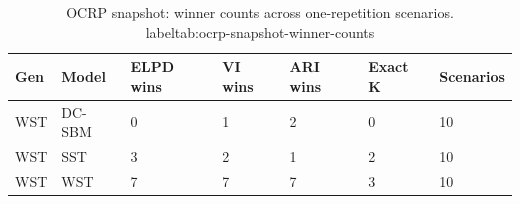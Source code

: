 \begin{table}[!h]
\centering
\caption{OCRP snapshot: winner counts across one-repetition scenarios.\\label{tab:ocrp-snapshot-winner-counts}}
\centering
\begin{tabular}[t]{lllllll}
\toprule
Gen & Model & ELPD wins & VI wins & ARI wins & Exact K & Scenarios\\
\midrule
WST & DC-SBM & 0 & 1 & 2 & 0 & 10\\
WST & SST & 3 & 2 & 1 & 2 & 10\\
WST & WST & 7 & 7 & 7 & 3 & 10\\
\bottomrule
\end{tabular}
\end{table}
